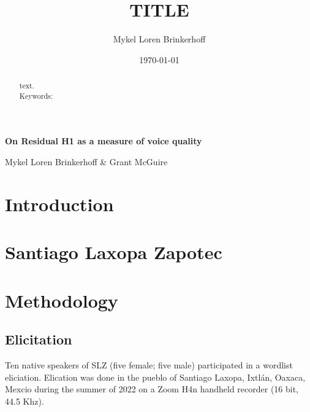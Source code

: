 \documentclass[12pt, letterpaper]{article}
\title{TITLE}
\author{Mykel Loren Brinkerhoff}
\date{\today}
\begin{document}

	\onehalfspacing

\begin{center}
     {\Large \textbf{On Residual H1 as a measure of voice quality}}
     \vspace{6pt}

     Mykel Loren Brinkerhoff \& Grant McGuire
\end{center}
\thispagestyle{fancy}


\begin{abstract}
    text.
    \\
    Keywords:
\end{abstract}

\section{Introduction} \label{sec:Introduction}


\section{Santiago Laxopa Zapotec} \label{sec:SLZ}


\section{Methodology} \label{sec:Methods}

\subsection{Elicitation} \label{sec:Elicitation}
Ten native speakers of SLZ (five female; five male) participated in a wordlist eliciation. Elication was done in the pueblo of Santiago Laxopa, Ixtlán, Oaxaca, Mexcio during the summer of 2022 on a Zoom H4n handheld recorder (16 bit, 44.5 Khz). 
\end{document}

